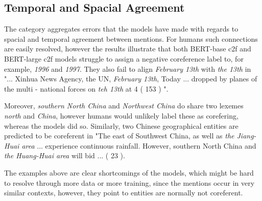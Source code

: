 \documentclass[11pt]{article}
\begin{document}
\subsection{Temporal and Spacial Agreement}
The category aggregates errors that the models have made with regards to spacial and temporal agreement between mentions. For humans such connections are easily resolved, however the results illustrate that both BERT-base c2f and BERT-large c2f models struggle to assign a negative coreference label to, for example, \textit{1996} and \textit{1997}. They also fail to align \textit{February 13th} with \textit{the 13th} in "... Xinhua News Agency, the UN, \textit{February 13th}, Today ... dropped by planes of the multi - national forces on \textit{teh 13th} at 4 ( 153 ) ". 

Moreover, \textit{southern North China} and \textit{Northwest China} do share two lexemes \textit{north} and \textit{China}, however humans would unlikely label these as corefering, whereas the models did so. Similarly, two Chinese geographical entities are predicted to be coreferent in "The east of Southwest China, as well as \textit{the Jiang-Huai area} ... experience continuous rainfall. However, southern North China and \textit{the Huang-Huai area} will bid ... ( 23 ). 

The examples above are clear shortcomings of the models, which might be hard to resolve through more data or more training, since the mentions occur in very similar contexts, however, they point to entities are normally not coreferent. 
\end{document}
